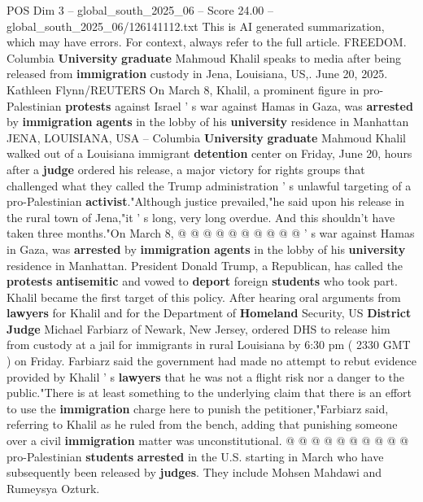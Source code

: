 \begin{textsample}{POS Dim 3 – global\_south\_2025\_06 – Score 24.00 – global\_south\_2025\_06/126141112.txt}  \label{ex:f3_pos_200}
This is AI generated summarization, which may have errors.
For context, always refer to the full article.
FREEDOM.
Columbia \textbf{University} \textbf{graduate} Mahmoud Khalil speaks to media after being released from \textbf{immigration} custody in Jena, Louisiana, US,.
June 20, 2025.
Kathleen Flynn/REUTERS On March 8, Khalil, a prominent figure in pro-Palestinian \textbf{protests} against Israel ' s war against Hamas in Gaza, was \textbf{arrested} by \textbf{immigration} \textbf{agents} in the lobby of his \textbf{university} residence in Manhattan JENA, LOUISIANA, USA -- Columbia \textbf{University} \textbf{graduate} Mahmoud Khalil walked out of a Louisiana immigrant \textbf{detention} center on Friday, June 20, hours after a \textbf{judge} ordered his release, a major victory for rights groups that challenged what they called the Trump administration ' s unlawful targeting of a pro-Palestinian \textbf{activist}."Although justice prevailed,"he said upon his release in the rural town of Jena,"it ' s long, very long overdue.
And this shouldn't have taken three months."On March 8, @ @ @ @ @ @ @ @ @ @ ' s war against Hamas in Gaza, was \textbf{arrested} by \textbf{immigration} \textbf{agents} in the lobby of his \textbf{university} residence in Manhattan.
President Donald Trump, a Republican, has called the \textbf{protests} \textbf{antisemitic} and vowed to \textbf{deport} foreign \textbf{students} who took part.
Khalil became the first target of this policy.
After hearing oral arguments from \textbf{lawyers} for Khalil and for the Department of \textbf{Homeland} Security, US \textbf{District} \textbf{Judge} Michael Farbiarz of Newark, New Jersey, ordered DHS to release him from custody at a jail for immigrants in rural Louisiana by 6:30 pm ( 2330 GMT ) on Friday.
Farbiarz said the government had made no attempt to rebut evidence provided by Khalil ' s \textbf{lawyers} that he was not a flight risk nor a danger to the public."There is at least something to the underlying claim that there is an effort to use the \textbf{immigration} charge here to punish the petitioner,"Farbiarz said, referring to Khalil as he ruled from the bench, adding that punishing someone over a civil \textbf{immigration} matter was unconstitutional. @ @ @ @ @ @ @ @ @ @ pro-Palestinian \textbf{students} \textbf{arrested} in the U.S. starting in March who have subsequently been released by \textbf{judges}.
They include Mohsen Mahdawi and Rumeysya Ozturk.

\end{textsample}
